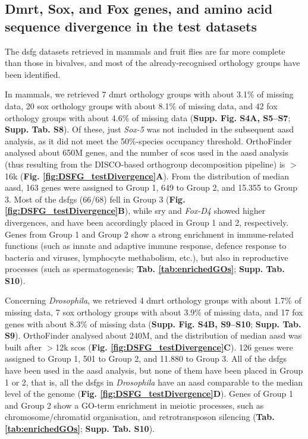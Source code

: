 \documentclass[../main.tex]{subfiles}
\begin{document}
\subsection{Dmrt, Sox, and Fox genes, and amino acid sequence divergence in the test datasets}
The \gls{dsfg} datasets retrieved in mammals and fruit flies are far more complete than those in bivalves, and most of the already-recognised orthology groups have been identified.

In mammals, we retrieved 7 \gls{dmrt} orthology groups with about 3.1\% of missing data, 20 \gls{sox} orthology groups with about 8.1\% of missing data, and 42 \gls{fox} orthology groups with about 4.6\% of missing data (\textbf{Supp. Fig. S4A, S5--S7}; \textbf{Supp. Tab. S8}). Of these, just \textit{Sox-5} was not included in the subsequent \gls{aasd} analysis, as it did not meet the 50\%-species occupancy threshold. OrthoFinder analysed about 650M genes, and the number of \glspl{sco} used in the \gls{aasd} analysis (thus resulting from the DISCO-based orthogroup decomposition pipeline) is $>$16k (\textbf{Fig. \ref{fig:DSFG_testDivergence}A}). From the distribution of median \gls{aasd}, 163 genes were assigned to Group 1, 649 to Group 2, and 15.355 to Group 3. Most of the \glspl{dsfg} (66/68) fell in Group 3 (\textbf{Fig. \ref{fig:DSFG_testDivergence}B}), while \gls{sry} and \textit{Fox-D4} showed higher divergences, and have been accordingly placed in Group 1 and 2, respectively. Genes from Group 1 and Group 2 show a strong enrichment in immune-related functions (such as innate and adaptive immune response, defence response to bacteria and viruses, lymphocyte methabolism, etc.), but also in reproductive processes (such as spermatogenesis; \textbf{Tab. \ref{tab:enrichedGOs}}; \textbf{Supp. Tab. S10}).

Concerning \textit{Drosophila}, we retrieved 4 \gls{dmrt} orthology groups with about 1.7\% of missing data, 7 \gls{sox} orthology groups with about 3.9\% of missing data, and 17 \gls{fox} genes with about 8.3\% of missing data (\textbf{Supp. Fig. S4B, S9--S10}; \textbf{Supp. Tab. S9}). OrthoFinder analysed about 240M, and the distribution of median \gls{aasd} was built after $>$12k \glspl{sco} (\textbf{Fig. \ref{fig:DSFG_testDivergence}C}). 126 genes were assigned to Group 1, 501 to Group 2, and 11.880 to Group 3. All of the \glspl{dsfg} have been used in the \gls{aasd} analysis, but none of them have been placed in Group 1 or 2, that is, all the \glspl{dsfg} in \textit{Drosophila} have an \gls{aasd} comparable to the median level of the genome (\textbf{Fig. \ref{fig:DSFG_testDivergence}D}). Genes of Group 1 and Group 2 show a GO-term enrichment in meiotic processes, such as chromosome/chromatid organisation, and retrotransposon silencing (\textbf{Tab. \ref{tab:enrichedGOs}}; \textbf{Supp. Tab. S10}).
\end{document}

